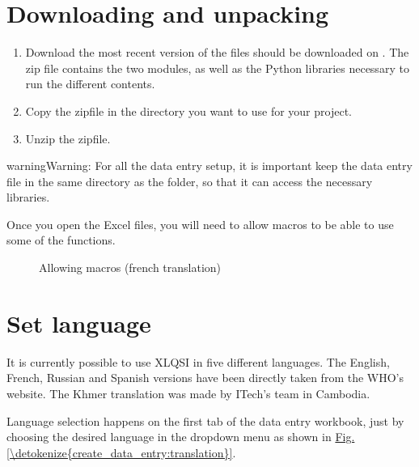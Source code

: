 \documentclass[letterpaper,10pt,english]{sphinxmanual}
\begin{document}
\section{Downloading and unpacking}
\label{\detokenize{create_data_entry:downloading-and-unpacking}}\begin{enumerate}
\item {} 
Download the most recent version of the files should be downloaded on . The zip file contains the two modules, as well as the Python libraries necessary to run the different contents.

\item {} 
Copy the zipfile in the directory you want to use for your project.

\item {} 
Unzip the zipfile.

\end{enumerate}

\begin{sphinxadmonition}{warning}{Warning:}
For all the data entry setup, it is important keep the data entry file in the same directory as the  folder, so that it can access the necessary libraries.
\end{sphinxadmonition}

Once  you open the Excel files, you will need to allow macros to be able to use some of the functions.

\begin{figure}[htbp]
\centering
\capstart

\noindent{}
\caption{Allowing macros (french translation)}\label{\detokenize{create_data_entry:security-check}}\end{figure}


\section{Set language}
\label{\detokenize{create_data_entry:set-language}}
It is currently possible to use XLQSI in five different languages. The English, French, Russian and Spanish versions have been directly taken from the WHO’s website. The Khmer translation was made by ITech’s team in Cambodia.

Language selection happens on the first tab of the data entry workbook, just by choosing the desired language in the dropdown menu as shown in \hyperref[\detokenize{create_data_entry:translation}]{Fig.\@ \ref{\detokenize{create_data_entry:translation}}}.
\end{document}
